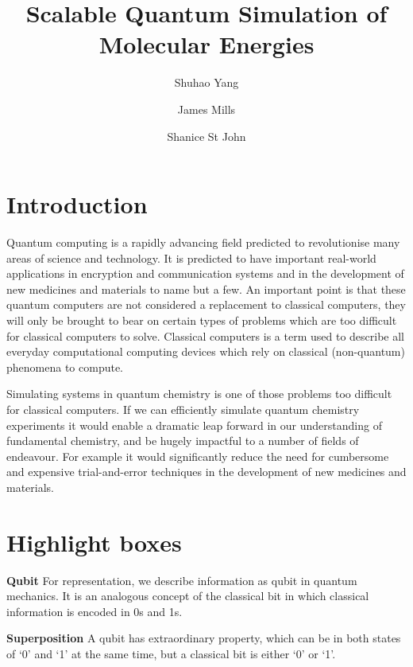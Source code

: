 \documentclass[14pt,landscape,color=UCLdarkred,margin=3cm]{uclposter}
\title{Scalable Quantum Simulation of Molecular Energies}
\author{Shuhao Yang}
\author{James Mills}
\author{Shanice St John}
\affil[1]{Department of LaTeX Studies, UCL}
\begin{document}
\large

\maketitle

\begin{multicols}{3}

\section*{Introduction}
Quantum computing is a rapidly advancing field predicted to revolutionise many
areas of science and technology. It is predicted to have important real-world applications in encryption and communication systems and in the development of new medicines and materials to name but a few. An important point is that these quantum computers are not considered a replacement to classical computers, they will only be brought to bear on certain types of problems which are too difficult for classical computers to solve. Classical computers is a term used to describe all everyday computational computing devices which rely on classical (non-quantum) phenomena to compute.

Simulating systems in quantum chemistry is one of those problems too difficult for classical computers. If we can efficiently simulate quantum chemistry experiments it would enable a dramatic leap forward in our understanding of fundamental chemistry, and be hugely impactful to a number of fields of endeavour. For example it would significantly reduce the need for cumbersome and expensive trial-and-error techniques in the development of new medicines and materials.


\section*{Highlight boxes}




\begin{highlightbox}
	\textbf{Qubit} For representation, we describe information as qubit in quantum mechanics. It is an analogous concept of the classical bit in which classical information is encoded in 0s and 1s.
\end{highlightbox}

\begin{highlightbox}
  \textbf{Superposition} A qubit has extraordinary property, which can be in both states of `0' and `1' at the same time, but a classical bit is either `0' or `1'.
\end{highlightbox}


\end{multicols}
\end{document}
